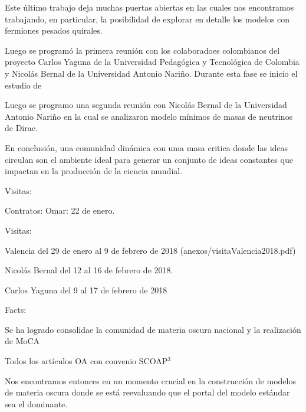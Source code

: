  Este último trabajo deja muchas puertas abiertas en las cuales nos encontramos trabajando, en particular, la posibilidad de explorar en detalle los modelos con fermiones pesados quirales.
\begin{ideas}

















Luego se programó la primera reunión con los colaboradoes colombianos del proyecto Carlos Yaguna de la Universidad Pedagógica y Tecnológica de Colombia y Nicolás Bernal de la Universidad Antonio Nariño. Durante esta fase se inicio el estudio de

Luego se programo una segunda reunión con Nicolás Bernal de la Universidad Antonio Nariño en la cual se analizaron modelo mínimos de masas de neutrinos de Dirac.


En conclusión, una comunidad dinámica con uma masa critica donde las ideas circulan son el ambiente ideal para generar un conjunto de ideas constantes que impactan en la producción de la ciencia mundial.








Visitas:

Contratos:
Omar: 22 de enero.

Visitas:

Valencia del 29 de enero al 9 de febrero de 2018 (anexos/visitaValencia2018.pdf)

Nicolás Bernal del 12 al 16 de febrero de 2018.

Carlos Yaguna del 9 al 17 de febrero de 2018

Facts:

Se ha logrado consolidae la comunidad de materia oscura nacional y la realización de MoCA

Todos los artículos OA con convenio SCOAP$^3$

Nos encontramos entonces en un momento crucial en la construcción de modelos de materia oscura
donde se está reevaluando que el portal del modelo estándar sea el dominante.


\end{ideas}
